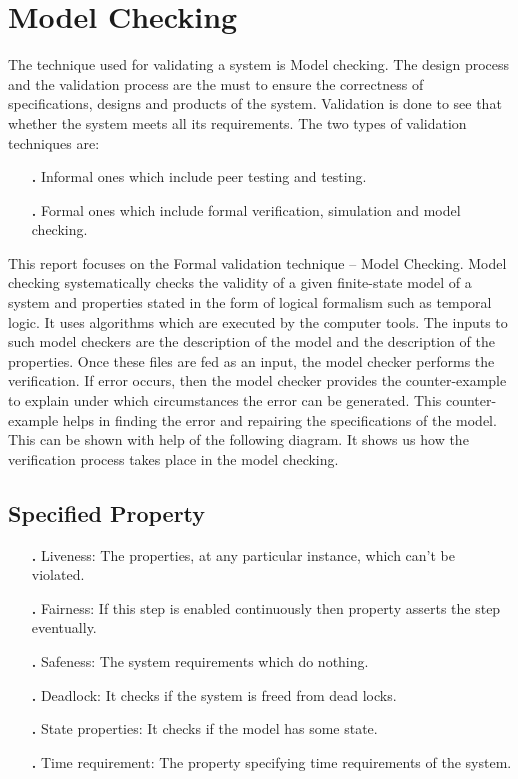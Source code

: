 \documentclass{article}
\begin{document}
\section{Model Checking}
The technique used for validating a system is Model checking. The design process and the validation process are the must to ensure the correctness of specifications, designs and products of the system. Validation is done to see that whether the system meets all its requirements. 
The two types of validation techniques are: 
\begin{itemize}
\item[\textbf{.}]Informal ones which include peer testing and testing.

\end{itemize}	
\begin{itemize}
\item[\textbf{.}]Formal ones which include formal verification, simulation and model checking. 

\end{itemize}	
This report focuses on the Formal validation technique – Model Checking. 
Model checking systematically checks the validity of a given finite-state model of a system and properties stated in the form of logical formalism such as temporal logic. It uses algorithms which are executed by the computer tools. The inputs to such model checkers are the description of the model and the description of the properties. Once these files are fed as an input, the model checker performs the verification. If error occurs, then the model checker provides the counter-example to explain under which circumstances the error can be generated. This counter-example helps in finding the error and repairing the specifications of the model. This can be shown with help of the following diagram. It shows us how the verification process takes place in the model checking.                                                  
\subsection{Specified Property}
\begin{itemize}
\item[\textbf{.}]Liveness: The properties, at any particular instance, which can’t be violated.
\item[\textbf{.}]Fairness: If this step is enabled continuously then property asserts the step eventually.
\item[\textbf{.}]Safeness: The system requirements which do nothing.
\item[\textbf{.}]Deadlock: It checks if the system is freed from dead locks.
\item[\textbf{.}]State properties: It checks if the model has some state.
\item[\textbf{.}]Time requirement: The property specifying time requirements of the system. 

\end{itemize}
\end{document}
